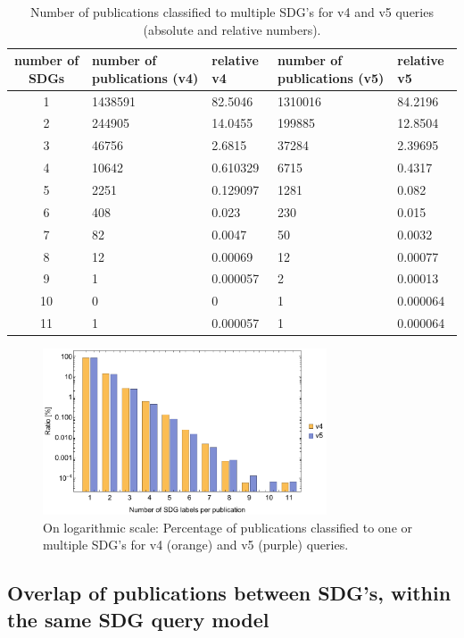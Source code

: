 \documentclass{article}
\begin{document}
\begin{table}[H]
 \begin{tabular}{cllll}
 \toprule
 number of SDGs & number of publications (v4) & relative v4 & number of publications (v5) & relative v5 \\
 \hline
 1 & 1438591 & 82.5046 & 1310016 & 84.2196 \\
 2 & 244905 & 14.0455 & 199885 & 12.8504 \\
 3 & 46756 & 2.6815 & 37284 & 2.39695 \\
 4 & 10642 & 0.610329 & 6715 & 0.4317 \\
 5 & 2251 & 0.129097 & 1281 & 0.082 \\
 6 & 408 & 0.023 & 230 & 0.015 \\
 7 & 82 & 0.0047 & 50 & 0.0032 \\
 8 & 12 & 0.00069 & 12 & 0.00077 \\
 9 & 1 & 0.000057 & 2 & 0.00013 \\
 10 & 0 & 0 & 1 & 0.000064 \\
 11 & 1 & 0.000057 & 1 & 0.000064 \\
 \bottomrule
\end{tabular} \caption{Number of publications classified to multiple SDG's for v4 and v5 queries (absolute and relative numbers).}
\label{multipleSDG's}
\end{table}

\begin{figure}[H]
	\centering
  \includegraphics[width=0.75\textwidth]{figures/histogram-multipleSDGlabels-barchartv4+v5.pdf}
	\caption{On logarithmic scale: Percentage of publications classified to one or multiple SDG's for v4 (orange) and v5 (purple) queries.}
\end{figure}

\subsection{Overlap of publications between SDG's, within the same SDG query model}
\end{document}
